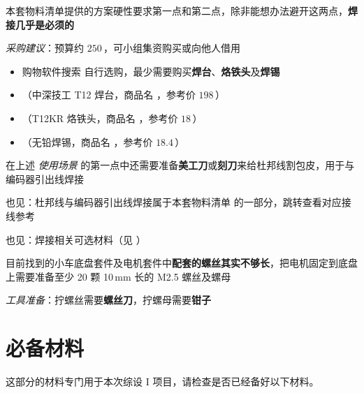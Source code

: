 \documentclass[11pt,a4paper]{article}
\begin{document}
本套物料清单提供的方案硬性要求第一点和第二点，除非能想办法避开这两点，\textbf{焊接几乎是必须的}

\emph{采购建议}：预算约 $250$\,\yuan，可小组集资购买或向他人借用

\begin{itemize}
  \item 购物软件搜索  自行选购，最少需要购买\textbf{焊台}、\textbf{烙铁头}及\textbf{焊锡}
  \item {}（中深技工 T12 焊台，商品名 ，参考价 $198$\,\yuan）
  \item {}（T12KR 烙铁头，商品名 ，参考价 $18$\,\yuan）
  \item {}（无铅焊锡，商品名 ，参考价 $18.4$\,\yuan）
\end{itemize}

在上述 \emph{使用场景} 的第一点中还需要准备\textbf{美工刀}或\textbf{刻刀}来给杜邦线割包皮，用于与编码器引出线焊接

\begin{seealso}
  也见：杜邦线与编码器引出线焊接属于本套物料清单  的一部分，跳转查看对应接线参考
\end{seealso}

\begin{seealso}
  也见：焊接相关可选材料（见 ）
\end{seealso}

\label{pt:fastener}

\begin{calloutwarning}
  目前找到的小车底盘套件及电机套件中\textbf{配套的螺丝其实不够长}，把电机固定到底盘上需要准备至少 20 颗 10\,mm 长的 M2.5 螺丝及螺母
\end{calloutwarning}

\emph{工具准备}：拧螺丝需要\textbf{螺丝刀}，拧螺母需要\textbf{钳子}

\section{必备材料}

这部分的材料专门用于本次综设 I 项目，请检查是否已经备好以下材料。
\end{document}
